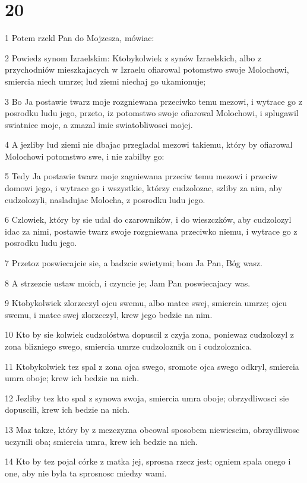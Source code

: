 \chapter{20}

\par 1 Potem rzekl Pan do Mojzesza, mówiac:
\par 2 Powiedz synom Izraelskim: Ktobykolwiek z synów Izraelskich, albo z przychodniów mieszkajacych w Izraelu ofiarowal potomstwo swoje Molochowi, smiercia niech umrze; lud ziemi niechaj go ukamionuje;
\par 3 Bo Ja postawie twarz moje rozgniewana przeciwko temu mezowi, i wytrace go z posrodku ludu jego, przeto, iz potomstwo swoje ofiarowal Molochowi, i splugawil swiatnice moje, a zmazal imie swiatobliwosci mojej.
\par 4 A jezliby lud ziemi nie dbajac przegladal mezowi takiemu, który by ofiarowal Molochowi potomstwo swe, i nie zabilby go:
\par 5 Tedy Ja postawie twarz moje zagniewana przeciw temu mezowi i przeciw domowi jego, i wytrace go i wszystkie, którzy cudzolozac, szliby za nim, aby cudzolozyli, nasladujac Molocha, z posrodku ludu jego.
\par 6 Czlowiek, który by sie udal do czarowników, i do wieszczków, aby cudzolozyl idac za nimi, postawie twarz swoje rozgniewana przeciwko niemu, i wytrace go z posrodku ludu jego.
\par 7 Przetoz poswiecajcie sie, a badzcie swietymi; bom Ja Pan, Bóg wasz.
\par 8 A strzezcie ustaw moich, i czyncie je; Jam Pan poswiecajacy was.
\par 9 Ktobykolwiek zlorzeczyl ojcu swemu, albo matce swej, smiercia umrze; ojcu swemu, i matce swej zlorzeczyl, krew jego bedzie na nim.
\par 10 Kto by sie kolwiek cudzolóstwa dopuscil z czyja zona, poniewaz cudzolozyl z zona blizniego swego, smiercia umrze cudzoloznik on i cudzoloznica.
\par 11 Ktobykolwiek tez spal z zona ojca swego, sromote ojca swego odkryl, smiercia umra oboje; krew ich bedzie na nich.
\par 12 Jezliby tez kto spal z synowa swoja, smiercia umra oboje; obrzydliwosci sie dopuscili, krew ich bedzie na nich.
\par 13 Maz takze, który by z mezczyzna obcowal sposobem niewiescim, obrzydliwosc uczynili oba; smiercia umra, krew ich bedzie na nich.
\par 14 Kto by tez pojal córke z matka jej, sprosna rzecz jest; ogniem spala onego i one, aby nie byla ta sprosnosc miedzy wami.
